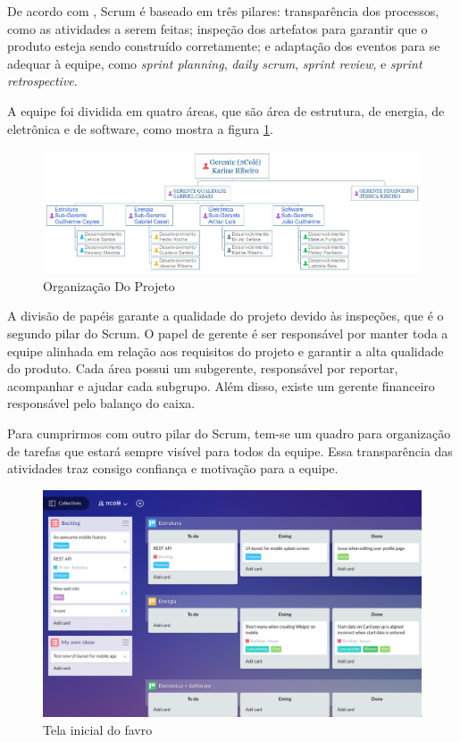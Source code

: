 De acordo com \cite{the_scrum_guide}, Scrum é baseado em três pilares: transparência dos processos, como as atividades a serem feitas; inspeção dos artefatos para garantir que o produto esteja sendo construído corretamente; e adaptação dos eventos para se adequar à equipe, como \textit{sprint planning}, \textit{daily scrum}, \textit{sprint review}, e \textit{sprint retrospective}.

A equipe foi dividida em quatro áreas, que são área de estrutura, de energia, de eletrônica e de software, como mostra a figura \ref{fig:organograma}.

\begin{figure}[H]
	\centering
    \includegraphics[scale=0.3]{figuras/organograma}
    \caption{Organização Do Projeto}
    \label{fig:organograma}
\end{figure}

A divisão de papéis garante a qualidade do projeto devido às inspeções, que é o segundo pilar do Scrum. O papel de gerente é ser responsável por manter toda a equipe alinhada em relação aos requisitos do projeto e garantir a alta qualidade do produto. Cada área possui um subgerente, responsável por reportar, acompanhar e ajudar cada subgrupo. Além disso, existe um gerente financeiro responsável pelo balanço do caixa.

Para cumprirmos com outro pilar do Scrum, tem-se um quadro para organização de tarefas que estará sempre visível para todos da equipe. Essa transparência das atividades traz consigo confiança e motivação para a equipe.

\begin{figure}[H]
	\centering
    \includegraphics[scale=0.5]{figuras/favro}
    \caption{Tela inicial do favro}
    \label{fig:favro}
\end{figure}

